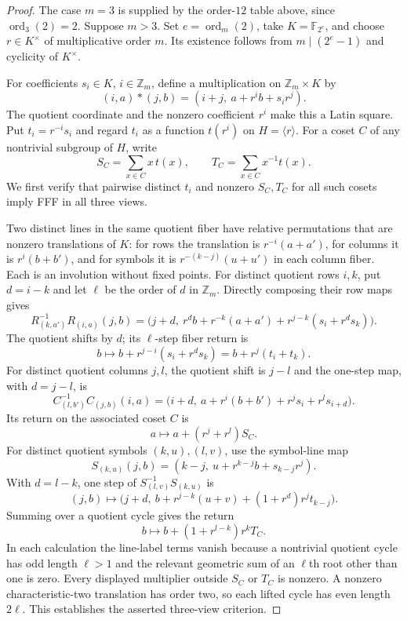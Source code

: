 \begin{proof}
The case $m=3$ is supplied by the order-$12$ table above, since
$\operatorname{ord}_3(2)=2$.  Suppose $m>3$.  Set
$e=\operatorname{ord}_m(2)$, take $K=\mathbb F_{2^e}$, and choose
$r\in K^\times$ of multiplicative order $m$.  Its existence follows from
$m\mid(2^e-1)$ and cyclicity of $K^\times$.

For coefficients $s_i\in K$, $i\in\mathbb Z_m$, define a multiplication on
$\mathbb Z_m\times K$ by
\begin{equation}\label{eq:three-point-lift}
 (i,a)*(j,b)=(i+j,\ a+r^i b+s_i r^j).
\end{equation}
The quotient coordinate and the nonzero coefficient $r^i$ make this a Latin
square.  Put $t_i=r^{-i}s_i$ and regard $t_i$ as a function $t(r^i)$ on
$H=\langle r\rangle$.  For a coset $C$ of any nontrivial subgroup of $H$,
write
\[
 S_C=\sum_{x\in C}x\,t(x),\qquad
 T_C=\sum_{x\in C}x^{-1}t(x).
\]
We first verify that pairwise distinct $t_i$ and nonzero $S_C,T_C$ for all
such cosets imply FFF in all three views.

Two distinct lines in the same quotient fiber have relative permutations
that are nonzero translations of $K$: for rows the translation is
$r^{-i}(a+a')$, for columns it is $r^i(b+b')$, and for symbols it is
$r^{-(k-j)}(u+u')$ in each column fiber.  Each is an involution without
fixed points.  For distinct quotient rows $i,k$, put $d=i-k$ and let
$\ell$ be the order of $d$ in $\mathbb Z_m$.  Directly composing their row
maps gives
\[
 R_{(k,a')}^{-1}R_{(i,a)}(j,b)
 =\bigl(j+d,\ r^d b+r^{-k}(a+a')
       +r^{j-k}(s_i+r^d s_k)\bigr).
\]
The quotient shifts by $d$; its $\ell$-step fiber return is
\[
 b\longmapsto b+r^{j-i}(s_i+r^d s_k)
              =b+r^j(t_i+t_k).
\]
For distinct quotient columns $j,l$, the quotient shift is $j-l$ and the
one-step map, with $d=j-l$, is
\[
 C_{(l,b')}^{-1}C_{(j,b)}(i,a)
 =\bigl(i+d,\ a+r^i(b+b')+r^j s_i+r^l s_{i+d}\bigr).
\]
Its return on the associated coset $C$ is
\[
 a\longmapsto a+(r^j+r^l)S_C.
\]
For distinct quotient symbols $(k,u),(l,v)$, use the symbol-line map
\[
 S_{(k,u)}(j,b)=(k-j,\ u+r^{k-j}b+s_{k-j}r^j).
\]
With $d=l-k$, one step of $S_{(l,v)}^{-1}S_{(k,u)}$ is
\[
 (j,b)\longmapsto
 \bigl(j+d,\ b+r^{j-k}(u+v)+(1+r^d)r^j t_{k-j}\bigr).
\]
Summing over a quotient cycle gives the return
\[
 b\longmapsto b+(1+r^{l-k})r^k T_C.
\]
In each calculation the line-label terms vanish because a nontrivial
quotient cycle has odd length $\ell>1$ and the relevant geometric sum of
an $\ell$th root other than one is zero.  Every displayed multiplier outside
$S_C$ or $T_C$ is nonzero.  A nonzero characteristic-two translation has
order two, so each lifted cycle has even length $2\ell$.  This establishes
the asserted three-view criterion.


\end{proof}
